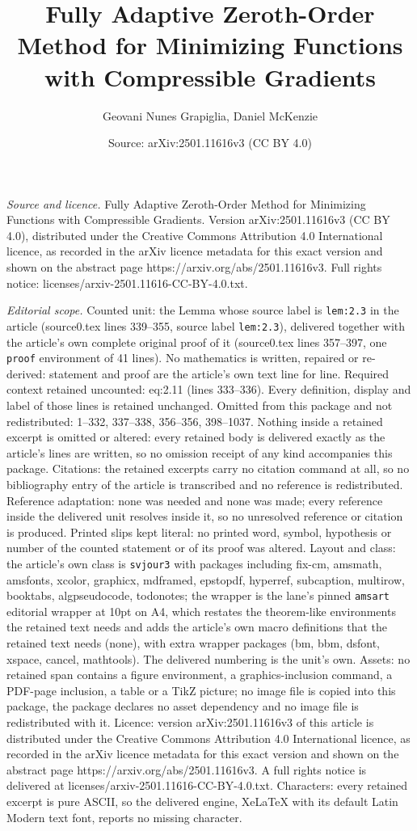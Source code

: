 \documentclass[10pt,a4paper]{amsart}
\title[Fully Adaptive Zeroth-Order Method for Minimizing Functions ]{Fully Adaptive Zeroth-Order Method for Minimizing Functions with Compressible Gradients}
\author{Geovani Nunes Grapiglia, Daniel McKenzie}
\date{Source: arXiv:2501.11616v3 (CC BY 4.0)}
\begin{document}
\maketitle

\noindent\emph{Source and licence.} Fully Adaptive Zeroth-Order Method for Minimizing Functions with Compressible Gradients. Version arXiv:2501.11616v3 (CC BY 4.0), distributed under the Creative Commons Attribution 4.0 International licence, as recorded in the arXiv licence metadata for this exact version and shown on the abstract page https://arxiv.org/abs/2501.11616v3. Full rights notice: licenses/arxiv-2501.11616-CC-BY-4.0.txt.\par\smallskip

\noindent\textit{Editorial scope.} Counted unit: the Lemma whose source label is \texttt{lem:2.3} in the article (source0.tex lines 339--355, source label \texttt{lem:2.3}), delivered together with the article's own complete original proof of it (source0.tex lines 357--397, one \texttt{proof} environment of 41 lines). No mathematics is written, repaired or re-derived: statement and proof are the article's own text line for line. Required context retained uncounted: eq:2.11 (lines 333--336). Every definition, display and label of those lines is retained unchanged. Omitted from this package and not redistributed: 1--332, 337--338, 356--356, 398--1037. Nothing inside a retained excerpt is omitted or altered: every retained body is delivered exactly as the article's lines are written, so no omission receipt of any kind accompanies this package. Citations: the retained excerpts carry no citation command at all, so no bibliography entry of the article is transcribed and no reference is redistributed. Reference adaptation: none was needed and none was made; every reference inside the delivered unit resolves inside it, so no unresolved reference or citation is produced. Printed slips kept literal: no printed word, symbol, hypothesis or number of the counted statement or of its proof was altered. Layout and class: the article's own class is \texttt{svjour3} with packages including fix-cm, amsmath, amsfonts, xcolor, graphicx, mdframed, epstopdf, hyperref, subcaption, multirow, booktabs, algpseudocode, todonotes; the wrapper is the lane's pinned \texttt{amsart} editorial wrapper at 10pt on A4, which restates the theorem-like environments the retained text needs and adds the article's own macro definitions that the retained text needs (none), with extra wrapper packages (bm, bbm, dsfont, xspace, cancel, mathtools). The delivered numbering is the unit's own. Assets: no retained span contains a figure environment, a graphics-inclusion command, a PDF-page inclusion, a table or a TikZ picture; no image file is copied into this package, the package declares no asset dependency and no image file is redistributed with it. Licence: version arXiv:2501.11616v3 of this article is distributed under the Creative Commons Attribution 4.0 International licence, as recorded in the arXiv licence metadata for this exact version and shown on the abstract page https://arxiv.org/abs/2501.11616v3. A full rights notice is delivered at licenses/arxiv-2501.11616-CC-BY-4.0.txt. Characters: every retained excerpt is pure ASCII, so the delivered engine, XeLaTeX with its default Latin Modern text font, reports no missing character.
\end{document}
